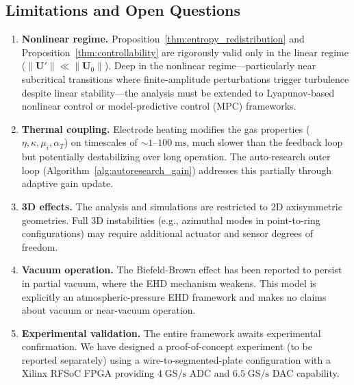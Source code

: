 \documentclass[12pt,twocolumn]{article}
\newcommand{\uu}{\mathbf{U}}
\begin{document}
\subsection{Limitations and Open Questions}
\label{sec:discussion:limitations}

\begin{enumerate}
  \item \textbf{Nonlinear regime.} Proposition~\ref{thm:entropy_redistribution}
    and Proposition~\ref{thm:controllability} are rigorously valid only
    in the linear regime ($\|\uu'\| \ll \|\uu_0\|$). Deep in the
    nonlinear regime---particularly near subcritical transitions
    where finite-amplitude perturbations trigger turbulence despite
    linear stability---the analysis must be extended to Lyapunov-based
    nonlinear control or model-predictive control (MPC) frameworks.

  \item \textbf{Thermal coupling.} Electrode heating modifies the
    gas properties ($\eta, \kappa, \mu_i, \alpha_T$) on timescales
    of $\sim 1$--$100\;\mathrm{ms}$, much slower than the feedback
    loop but potentially destabilizing over long operation. The
    auto-research outer loop (Algorithm~\ref{alg:autoresearch_gain})
    addresses this partially through adaptive gain update.

  \item \textbf{3D effects.} The analysis and simulations are
    restricted to 2D axisymmetric geometries. Full 3D instabilities
    (e.g., azimuthal modes in point-to-ring configurations) may
    require additional actuator and sensor degrees of freedom.

  \item \textbf{Vacuum operation.} The Biefeld-Brown effect has been
    reported to persist in partial vacuum, where the EHD mechanism
    weakens. This model is explicitly an atmospheric-pressure EHD
    framework and makes no claims about vacuum or near-vacuum
    operation.

  \item \textbf{Experimental validation.} The entire framework awaits
    experimental confirmation. We have designed a proof-of-concept
    experiment (to be reported separately) using a wire-to-segmented-plate
    configuration with a Xilinx RFSoC FPGA providing $4\;\mathrm{GS/s}$
    ADC and $6.5\;\mathrm{GS/s}$ DAC capability.
\end{enumerate}
\end{document}
